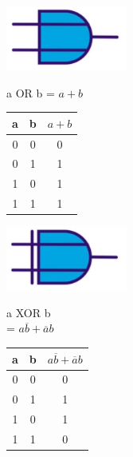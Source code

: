 \begin{minipage}{.4\textwidth}
	\centering
	\includegraphics[width=4cm]{figures/ch13/symbol_or.jpg}
	\label{fig:symbol_or}
\end{minipage}%
\begin{minipage}{.2\textwidth}
	a OR b = $a + b$
\end{minipage}%
\begin{minipage}{.4\textwidth}
	\begin{tabular}{|c|c|c|}
		\hline
		a & b  & $a + b$ \\
		\hline\hline
		0 & 0 & 0 \\
		\hline
		0 & 1 & 1 \\
		\hline
		1 & 0 & 1 \\
		\hline
		1 & 1 & 1 \\
		\hline
	\end{tabular}
\end{minipage}

\begin{minipage}{.4\textwidth}
	\centering
	\includegraphics[width=4cm]{figures/ch13/symbol_xor.jpg}
	\label{fig:symbol_xor}
\end{minipage}%
\begin{minipage}{.2\textwidth}
	a XOR b \\= $a\overline{b} + \overline{a}b$
\end{minipage}%
\begin{minipage}{.4\textwidth}
	\begin{tabular}{|c|c|c|}
		\hline
		a & b  & $a\overline{b} + \overline{a}b$ \\
		\hline\hline
		0 & 0 & 0 \\
		\hline
		0 & 1 & 1 \\
		\hline
		1 & 0 & 1 \\
		\hline
		1 & 1 & 0 \\
		\hline
	\end{tabular}
\end{minipage}

